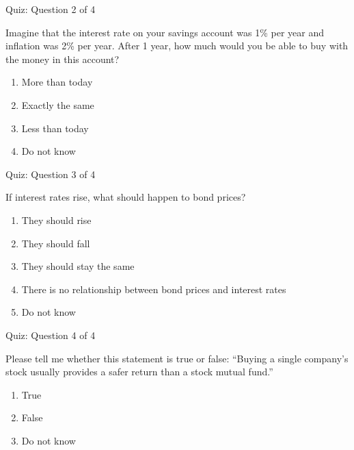 \documentclass[9pt,english,aspectratio=169]{beamer}
\begin{document}
\begin{frame}{Quiz: Question 2 of 4}

  \begin{questionbox}
    Imagine that the interest rate on your savings account was 1\% per year
    and inflation was 2\% per year. After 1 year, how much would you be able
    to buy with the money in this account?
  \end{questionbox}

  \vspace{1em}
  \begin{enumerate}
    \item More than today
    \item Exactly the same
    \item Less than today
    \item Do not know
  \end{enumerate}

\end{frame}

\begin{frame}{Quiz: Question 3 of 4}

  \begin{questionbox}
    If interest rates rise, what should happen to bond prices?
  \end{questionbox}

  \vspace{1em}
  \begin{enumerate}
    \item They should rise
    \item They should fall
    \item They should stay the same
    \item There is no relationship between bond prices and interest rates
    \item Do not know
  \end{enumerate}

\end{frame}

\begin{frame}{Quiz: Question 4 of 4}

  \begin{questionbox}
    Please tell me whether this statement is true or false: ``Buying a single
    company's stock usually provides a safer return than a stock mutual fund.''
  \end{questionbox}

  \vspace{1em}
  \begin{enumerate}
    \item True
    \item False
    \item Do not know
  \end{enumerate}

\end{frame}
\end{document}
